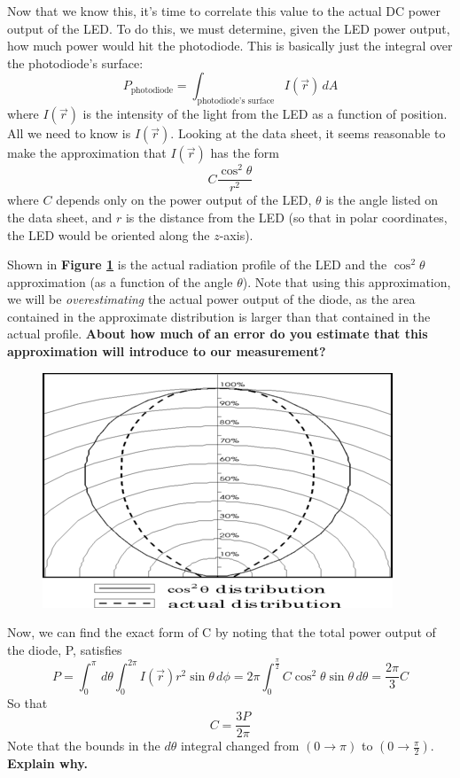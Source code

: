 \documentclass{../lab}
\begin{document}
Now that we know this, it's time to correlate this value to the actual DC power output of the LED. To do this, we must determine, given the LED power output, how much power would hit the photodiode. This is basically just the integral over the photodiode's surface:
\begin{equation}
    P_\text{photodiode} = \int_\text{photodiode's surface} I(\vec{r}) \,dA
\end{equation}
where $I(\vec{r})$ is the intensity of the light from the LED as a function of position. All we need to know is $I(\vec{r})$. Looking at the data sheet, it seems reasonable to make the approximation that $I(\vec{r})$ has the form
\begin{equation}
    C \frac{\cos^2{\theta}}{r^2}
\end{equation}
where $C$ depends only on the power output of the LED, $\theta$ is the angle listed on the data sheet, and $r$ is the distance from the LED (so that in polar coordinates, the LED would be oriented along the $z$-axis).

Shown in \textbf{Figure \ref{fig:RadiationProfile}} is the actual radiation profile of the LED and the $\cos^2\theta$ approximation (as a function of the angle $\theta$). Note that using this approximation, we will be \emph{overestimating} the actual power output of the diode, as the area contained in the approximate distribution is larger than that contained in the actual profile. \textbf{About how much of an error do you estimate that this approximation will introduce to our measurement?}


\begin{figure}[h]
    \centering
    \href{http://experimentationlab.berkeley.edu/sites/default/files/images/395px-Diode_Distribution.png}{\includegraphics[width=0.5\linewidth]{images/395px-Diode_Distribution.png}}
    \caption{}
    \label{fig:RadiationProfile}
\end{figure}

Now, we can find the exact form of C by noting that the total power output of the diode, P, satisfies
\begin{equation}
    P = \int_0^{\pi}\, d\theta \int_0^{2\pi}I(\vec{r})r^2\sin{\theta}\, d\phi
    = 2\pi\int_0^{\frac{\pi}{2}}C\cos^2{\theta}\sin{\theta}\, d\theta
    = \frac{2\pi}{3}C
\end{equation}
So that
\begin{equation}
    C = \frac{3P}{2\pi}
\end{equation}
Note that the bounds in the $d\theta$ integral changed from $(0\rightarrow\pi)$ to $(0\rightarrow\frac{\pi}{2})$. \textbf{Explain why.}
\end{document}
